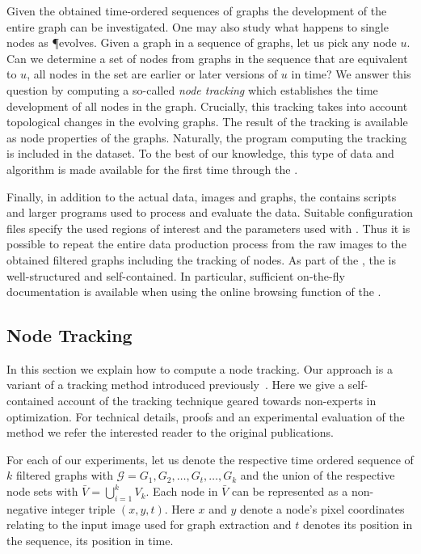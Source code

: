 	Given the obtained time-ordered sequences of graphs the development of the entire graph can be investigated. One may also study what happens to single nodes as \P evolves. Given a graph in a sequence of graphs, let us pick any node $u$. Can we determine a set of nodes from graphs in the sequence that are equivalent to $u$, \ie all nodes in the set are earlier or later versions of $u$ in time? We answer this question by computing a so-called \emph{node tracking} which establishes the time development of all nodes in the graph. Crucially, this tracking takes into account topological changes in the evolving graphs. The result of the tracking is available as node properties of the graphs. Naturally, the program computing the tracking is included in the dataset. To the best of our knowledge, this type of data and algorithm is made available for the first time through the \data.

	Finally, in addition to the actual data, \ie images and graphs, the \data contains scripts and larger programs used to process and evaluate the data. Suitable configuration files specify the used regions of interest and the parameters used with \NEFI. Thus it is possible to repeat the entire data production process from the raw images to the obtained filtered graphs including the tracking of nodes. As part of the \SMGR, the \data is well-structured and self-contained. In particular, sufficient on-the-fly documentation is available when using the online browsing function of the \SMGR.

	\subsection{Node Tracking}

		In this section we explain how to compute a node tracking. Our approach is a variant of a tracking method introduced previously~\cite{woll2013novel,Karrenbauer2013}. Here we give a self-contained account of the tracking technique geared towards non-experts in optimization. For technical details, proofs and an experimental evaluation of the method we refer the interested reader to the original publications.

		For each of our experiments, let us denote the respective time ordered sequence of $k$ filtered graphs with $\mathcal{G} = {G_1, G_2, \ldots, G_t, \ldots, G_k}$ and the union of the respective node sets with $\bar{V} = \bigcup_{i=1}^{k} V_{k}$. Each node in $\bar{V}$ can be represented as a non-negative integer triple $(x,y,t)$. Here $x$ and $y$ denote a node's pixel coordinates relating to the input image used for graph extraction and $t$ denotes its position in the sequence, \ie its position in time.

